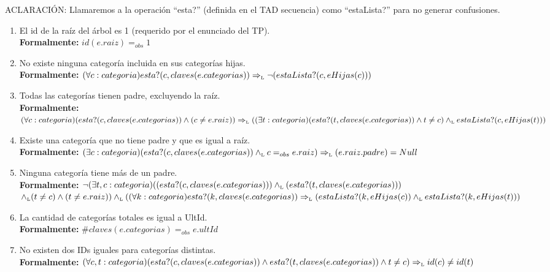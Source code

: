 \documentclass[10pt, a4paper]{article}
\begin{document}
ACLARACI\'ON: Llamaremos a la operaci\'on ``esta?'' (definida en el TAD secuencia) como ``estaLista?'' para no generar confusiones.\\ 
\begin{enumerate}
  \item El id de la ra\'iz del \'arbol es 1 (requerido por el enunciado del TP).\\
        {\bf Formalmente:} $id(e.raiz) =_{obs} 1$
        

  \item No existe ninguna categor\'ia incluida en sus categor\'ias hijas.\\
        {\bf Formalmente:} $(\forall c:categoria)esta?(c,claves(e.categorias)) \Rightarrow_{\mathrm{\scriptscriptstyle{L}}} \neg(estaLista?(c,eHijas(c)))$

  \item Todas las categor\'ias tienen padre, excluyendo la ra\'iz.\\
        {\bf Formalmente:} $(\forall c:categoria)(esta?(c,claves(e.categorias)) \land (c\not=e.raiz)) \Rightarrow_{\mathrm{\scriptscriptstyle{L}}} ((\exists t:categoria)(esta?(t,claves(e.categorias)) \land t\not=c) \land_{\mathrm{\scriptscriptstyle{L}}} estaLista?(c,eHijas(t)))$

  \item Existe una categor\'ia que no tiene padre y que es igual a ra\'iz.\\
        {\bf Formalmente:} $(\exists c:categoria)(esta?(c,claves(e.categorias)) \land_{\mathrm{\scriptscriptstyle{L}}} c=_{obs}e.raiz) \Rightarrow_{\mathrm{\scriptscriptstyle{L}}} (e.raiz.padre) = Null$
  	     
  \item Ninguna categor\'ia tiene m\'as de un padre.\\
        {\bf Formalmente:} $\neg(\exists t,c:categoria)((esta?(c,claves(e.categorias))) \land_{\mathrm{\scriptscriptstyle{L}}} (esta?(t,claves(e.categorias)))$ $\land_{\mathrm{\scriptscriptstyle{L}}} (t\not=c) \land (t\not=e.raiz)) \land_{\mathrm{\scriptscriptstyle{L}}} ((\forall k:categoria)esta?(k,claves(e.categorias)) \Rightarrow_{\mathrm{\scriptscriptstyle{L}}} (estaLista?(k,eHijas(c)) \land_{\mathrm{\scriptscriptstyle{L}}} estaLista?(k,eHijas(t)))$
  
  \item La cantidad de categor\'ias totales es igual a UltId.\\
        {\bf Formalmente:} $\#claves(e.categorias) =_{obs} e.ultId$
  
  
  \item No existen dos IDs iguales para categor\'ias distintas.\\
        {\bf Formalmente:} $(\forall c,t:categoria)(esta?(c,claves(e.categorias)) \land esta?(t,claves(e.categorias)) \land t\not=c) \Rightarrow_{\mathrm{\scriptscriptstyle{L}}} id(c)\not=id(t)$
        

\end{enumerate}
\end{document}
